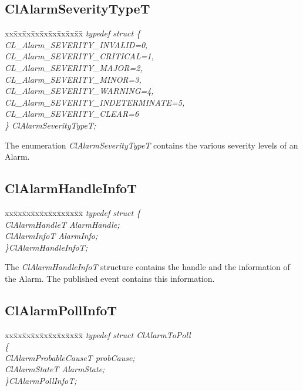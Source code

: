 \begin{flushleft}
\subsection{ClAlarmSeverityTypeT}
\begin{tabbing}
xx\=xx\=xx\=xx\=xx\=xx\=xx\=xx\=xx\=\kill
\textit{typedef struct \{}\\
\>\>\>\>\textit{CL\_Alarm\_SEVERITY\_INVALID=0,}\\
\>\>\>\>\textit{CL\_Alarm\_SEVERITY\_CRITICAL=1,}\\
\>\>\>\>\textit{CL\_Alarm\_SEVERITY\_MAJOR=2,}\\
\>\>\>\>\textit{CL\_Alarm\_SEVERITY\_MINOR=3,}\\
\>\>\>\>\textit{CL\_Alarm\_SEVERITY\_WARNING=4,}\\
\>\>\>\>\textit{CL\_Alarm\_SEVERITY\_INDETERMINATE=5,}\\
\>\>\>\>\textit{CL\_Alarm\_SEVERITY\_CLEAR=6}\\
\textit{\} ClAlarmSeverityTypeT;}\end{tabbing}
The enumeration \textit{ClAlarmSeverityTypeT} contains the various severity levels of an Alarm. 



\subsection{ClAlarmHandleInfoT}
\begin{tabbing}
xx\=xx\=xx\=xx\=xx\=xx\=xx\=xx\=xx\=\kill
\textit{typedef struct \{ }\\
\>\>\>\>\textit{ClAlarmHandleT AlarmHandle;}\\
    \>\>\>\>\textit{ClAlarmInfoT   AlarmInfo;}\\
\textit{\}ClAlarmHandleInfoT;}\end{tabbing}
The \textit{ClAlarmHandleInfoT} structure contains the handle and the information of the Alarm. The published event
contains this information.



\subsection{ClAlarmPollInfoT}
\begin{tabbing}
xx\=xx\=xx\=xx\=xx\=xx\=xx\=xx\=xx\=\kill
\textit{typedef struct ClAlarmToPoll}\\
\>\>\>\>\textit{\{}\\
  \>\>\>\>\textit{ClAlarmProbableCauseT    probCause;}\\
    \>\>\>\>\textit{ClAlarmStateT AlarmState;}\\
\textit{\}ClAlarmPollInfoT;}\end{tabbing}


\end{flushleft}
